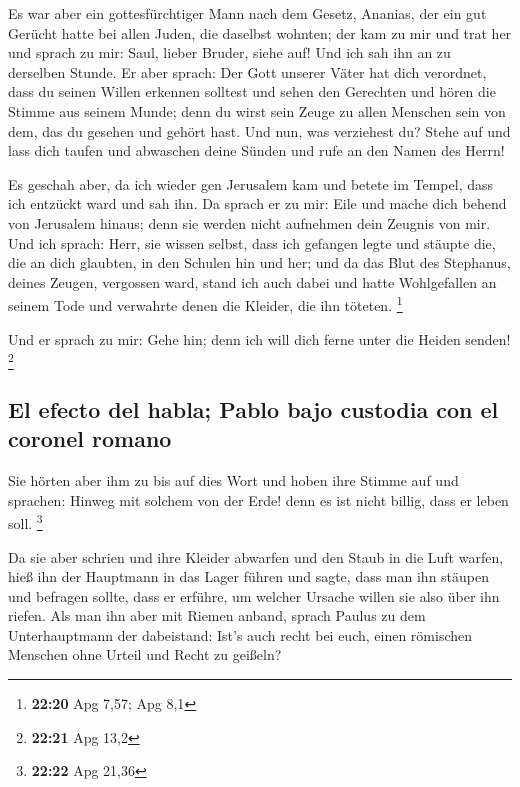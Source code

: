  Es war aber ein gottesfürchtiger Mann nach dem Gesetz,
Ananias, der ein gut Gerücht hatte bei allen Juden, die daselbst
wohnten;  der kam zu mir und trat her und sprach zu mir:
Saul, lieber Bruder, siehe auf! Und ich sah ihn an zu derselben Stunde.
 Er aber sprach: Der Gott unserer Väter hat dich
verordnet, dass du seinen Willen erkennen solltest und sehen den
Gerechten und hören die Stimme aus seinem Munde;  denn du
wirst sein Zeuge zu allen Menschen sein von dem, das du gesehen und
gehört hast.  Und nun, was verziehest du? Stehe auf und
lass dich taufen und abwaschen deine Sünden und rufe an den Namen des
Herrn!

 Es geschah aber, da ich wieder gen Jerusalem kam und
betete im Tempel, dass ich entzückt ward und sah ihn.  Da
sprach er zu mir: Eile und mache dich behend von Jerusalem hinaus; denn
sie werden nicht aufnehmen dein Zeugnis von mir.  Und ich
sprach: Herr, sie wissen selbst, dass ich gefangen legte und stäupte
die, die an dich glaubten, in den Schulen hin und her; 
und da das Blut des Stephanus, deines Zeugen, vergossen ward, stand ich
auch dabei und hatte Wohlgefallen an seinem Tode und verwahrte denen die
Kleider, die ihn töteten. \footnote{\textbf{22:20} Apg 7,57; Apg 8,1}

 Und er sprach zu mir: Gehe hin; denn ich will dich ferne
unter die Heiden senden! \footnote{\textbf{22:21} Apg 13,2}

\hypertarget{el-efecto-del-habla-pablo-bajo-custodia-con-el-coronel-romano}{%
\subsection{El efecto del habla; Pablo bajo custodia con el coronel
romano}\label{el-efecto-del-habla-pablo-bajo-custodia-con-el-coronel-romano}}

 Sie hörten aber ihm zu bis auf dies Wort und hoben ihre
Stimme auf und sprachen: Hinweg mit solchem von der Erde! denn es ist
nicht billig, dass er leben soll. \footnote{\textbf{22:22} Apg 21,36}

 Da sie aber schrien und ihre Kleider abwarfen und den
Staub in die Luft warfen,  hieß ihn der Hauptmann in das
Lager führen und sagte, dass man ihn stäupen und befragen sollte, dass
er erführe, um welcher Ursache willen sie also über ihn riefen.
 Als man ihn aber mit Riemen anband, sprach Paulus zu dem
Unterhauptmann der dabeistand: Ist's auch recht bei euch, einen
römischen Menschen ohne Urteil und Recht zu geißeln?

